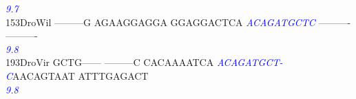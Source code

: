 \documentclass[11pt,twoside,reqno,a4paper]{article}
\begin{document}
{\hspace*{4\charwidth}\hspace*{7\charwidth}\hspace*{1\charwidth}\hspace*{1\charwidth}\hspace*{1\charwidth}\hspace*{30\charwidth}\textit{\textcolor{blue}{9.7}}\hspace*{1\charwidth}\hspace*{1\charwidth}\hspace*{1\charwidth}\\
153\hspace*{1\charwidth}DroWil	---------G	AGAAGGAGGA	GGAGGACTCA	\textit{\textcolor{blue}{A}}\textit{\textcolor{blue}{C}}\textit{\textcolor{blue}{A}}\textit{\textcolor{blue}{G}}\textit{\textcolor{blue}{A}}\textit{\textcolor{blue}{T}}\textit{\textcolor{blue}{G}}\textit{\textcolor{blue}{C}}\textit{\textcolor{blue}{T}}\textit{\textcolor{blue}{C}}	----------	----------	\\
\hspace*{4\charwidth}\hspace*{7\charwidth}\hspace*{1\charwidth}\hspace*{1\charwidth}\hspace*{1\charwidth}\hspace*{30\charwidth}\textit{\textcolor{blue}{9.8}}\hspace*{1\charwidth}\hspace*{1\charwidth}\hspace*{1\charwidth}\\
193\hspace*{1\charwidth}DroVir	GCTG------	---------C	CACAAAATCA	\textit{\textcolor{blue}{A}}\textit{\textcolor{blue}{C}}\textit{\textcolor{blue}{A}}\textit{\textcolor{blue}{G}}\textit{\textcolor{blue}{A}}\textit{\textcolor{blue}{T}}\textit{\textcolor{blue}{G}}\textit{\textcolor{blue}{C}}\textit{\textcolor{blue}{T}}\textit{\textcolor{blue}{-}}	\textit{\textcolor{blue}{C}}AACAGTAAT	ATTTGAGACT	\\
\hspace*{4\charwidth}\hspace*{7\charwidth}\hspace*{1\charwidth}\hspace*{1\charwidth}\hspace*{1\charwidth}\hspace*{30\charwidth}\textit{\textcolor{blue}{9.8}}\hspace*{1\charwidth}\hspace*{1\charwidth}\hspace*{1\charwidth}\\
}
\end{document}

